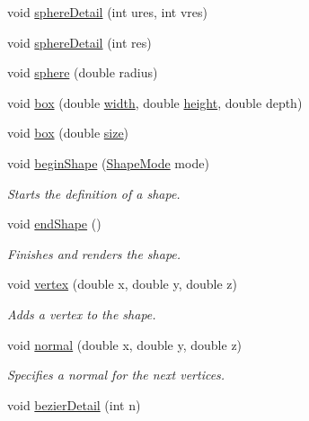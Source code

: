 \begin{DoxyCompactItemize}
\item 
void \hyperlink{namespacecprocessing_a21596477875fca056596a315117f9913}{sphere\-Detail} (int ures, int vres)
\item 
void \hyperlink{namespacecprocessing_a2a78420636e3fcd21e96f87be4b74316}{sphere\-Detail} (int res)
\item 
void \hyperlink{namespacecprocessing_ad12fe2bf0a14c6759624d8f6b66f5bd0}{sphere} (double radius)
\item 
void \hyperlink{namespacecprocessing_a28f122c44889d93bb070076ff6aaab9d}{box} (double \hyperlink{namespacecprocessing_a7af937eb8772235def57fcadd10fc82a}{width}, double \hyperlink{namespacecprocessing_ac392753eef02e2ad4ad84f5a076919be}{height}, double depth)
\item 
void \hyperlink{namespacecprocessing_acf30698a684da4beb34cee1ddbf37e60}{box} (double \hyperlink{namespacecprocessing_ab33eba8fec733b7b3a1a14f1191499bc}{size})
\item 
void \hyperlink{namespacecprocessing_afac44ac31031e9f27d12973e074230ff}{begin\-Shape} (\hyperlink{namespacecprocessing_a03538783321a3683ed8660f8bb23cd0c}{\-Shape\-Mode} mode)
\begin{DoxyCompactList}\small\item\em \-Starts the definition of a shape. \end{DoxyCompactList}\item 
void \hyperlink{namespacecprocessing_a1f0b4b628bd9d68c9321327a6ac7daf5}{end\-Shape} ()
\begin{DoxyCompactList}\small\item\em \-Finishes and renders the shape. \end{DoxyCompactList}\item 
void \hyperlink{namespacecprocessing_a790d9b7ae403d8cba72ae1c2f84f2fa7}{vertex} (double x, double y, double z)
\begin{DoxyCompactList}\small\item\em \-Adds a vertex to the shape. \end{DoxyCompactList}\item 
void \hyperlink{namespacecprocessing_a6d6f091f69de94483718a2a27d78f233}{normal} (double x, double y, double z)
\begin{DoxyCompactList}\small\item\em \-Specifies a normal for the next vertices. \end{DoxyCompactList}\item 
void \hyperlink{namespacecprocessing_aab8885eae2719fac74c66473a6c49d33}{bezier\-Detail} (int n)

\end{DoxyCompactItemize}
